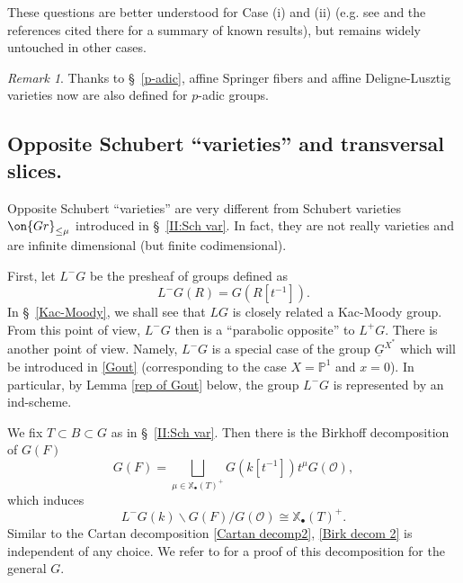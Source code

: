 \documentclass[]{pcmi}
\theoremstyle{plain}
\theoremstyle{remark}
\newtheorem{rmk}[equation]{Remark}
\theoremstyle{definition}
\newcommand{\bP}{{\mathbb P}}
\newcommand{\mO}{{\mathcal O}}
\newcommand{\Gr}{{\on{Gr}}}
\def\xcoch{\mathbb{X}_\bullet}
\begin{document}
These questions are better understood for Case (i) and (ii) (e.g. see \cite{Gortz, Yu} and the references cited there for a summary of known results), but remains widely untouched in other cases. 

\begin{rmk}Thanks to \S\ \ref{p-adic}, affine Springer fibers and affine Deligne-Lusztig varieties now are also defined for $p$-adic groups.\end{rmk}





\subsection{Opposite Schubert ``varieties'' and transversal slices.}
Opposite Schubert ``varieties'' are very different from Schubert varieties $\Gr_{\leq \mu}$ introduced in \S~\ref{II:Sch var}. In fact, they are not really varieties and are infinite dimensional (but finite codimensional). 

First, let $L^-G$ be the presheaf of groups defined as
\[L^-G(R)=G(R[t^{-1}]).\]
In \S~\ref{Kac-Moody}, we shall see that $LG$ is closely related a Kac-Moody group. From this point of view, $L^-G$ then is a ``parabolic opposite'' to $L^+G$.
There is another point of view. Namely, $L^-G$ is a special case of  the group $\underline G^{X^*}$ which will be introduced in \eqref{Gout} (corresponding to the case $X=\bP^1$ and $x=0$). In particular, by Lemma \ref{rep of Gout} below, the group $L^-G$ is represented by an ind-scheme. 


We fix $T\subset B\subset G$ as in \S~\ref{II:Sch var}.
Then there is the Birkhoff decomposition of $G(F)$
\begin{equation}\label{Birk decom}
G(F)=\bigsqcup_{\mu\in \xcoch(T)^+} G(k[t^{-1}])t^\mu G(\mO),
\end{equation}
which induces
\begin{equation}\label{Birk decom 2}
L^-G(k)\backslash G(F)/G(\mO)\cong \xcoch(T)^+.
\end{equation}
Similar to the Cartan decomposition \eqref{Cartan decomp2}, \eqref{Birk decom 2} is independent of any choice.
We refer to \cite[Lemma 4]{Fa} for a proof of this decomposition for the general $G$. 
\end{document}
